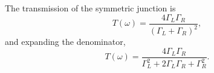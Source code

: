 \documentclass{article}
\begin{document}
The transmission of the symmetric junction is
\begin{equation}
T(\omega) = \frac{4\Gamma_L\Gamma_R}{(\Gamma_L+\Gamma_R)^2} ,
\label{eq:t1}
\end{equation}
and expanding the denominator,
\begin{equation}
T(\omega) = \frac{4\Gamma_L\Gamma_R}{\Gamma_L^2+2\Gamma_L\Gamma_R+\Gamma_R^2} .
\label{eq:t2}
\end{equation}
\end{document}
